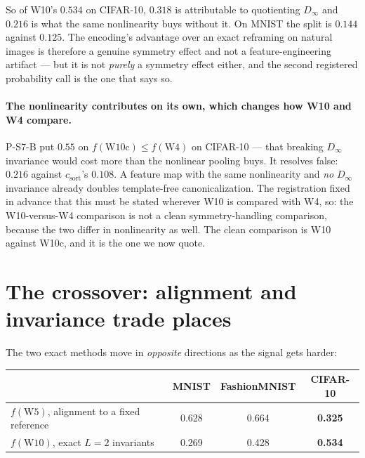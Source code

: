 \documentclass[10pt,letterpaper]{article}
\theoremstyle{definition}
\newcommand{\Dinf}{D_\infty}
\newcommand{\csort}{c_{\mathrm{sort}}}
\begin{document}
So of W10's $0.534$ on CIFAR-10, $0.318$ is attributable to quotienting $\Dinf$ and $0.216$ is
what the same nonlinearity buys without it. On MNIST the split is $0.144$ against $0.125$. The
encoding's advantage over an exact reframing on natural images is therefore a genuine symmetry
effect and not a feature-engineering artifact --- but it is not \emph{purely} a symmetry effect
either, and the second registered probability call is the one that says so.

\paragraph{The nonlinearity contributes on its own, which changes how W10 and W4 compare.}
P-S7-B put $0.55$ on $f(\mathrm{W10c}) \le f(\mathrm{W4})$ on CIFAR-10 --- that breaking $\Dinf$
invariance would cost more than the nonlinear pooling buys. It resolves false: $0.216$ against
$\csort$'s $0.108$. A feature map with the same nonlinearity and \emph{no} $\Dinf$ invariance
already doubles template-free canonicalization. The registration fixed in advance that this must be
stated wherever W10 is compared with W4, so: the W10-versus-W4 comparison is not a clean
symmetry-handling comparison, because the two differ in nonlinearity as well. The clean comparison
is W10 against W10c, and it is the one we now quote.

\section{The crossover: alignment and invariance trade places}\label{sec:crossover}

The two exact methods move in \emph{opposite} directions as the signal gets harder:
\begin{center}\small
\begin{tabular}{@{}lccc@{}}
\toprule
& MNIST & FashionMNIST & CIFAR-10 \\
\midrule
$f(\mathrm{W5})$, alignment to a fixed reference & 0.628 & 0.664 & \textbf{0.325} \\
$f(\mathrm{W10})$, exact $L{=}2$ invariants      & 0.269 & 0.428 & \textbf{0.534} \\
\bottomrule
\end{tabular}
\end{center}
\end{document}
